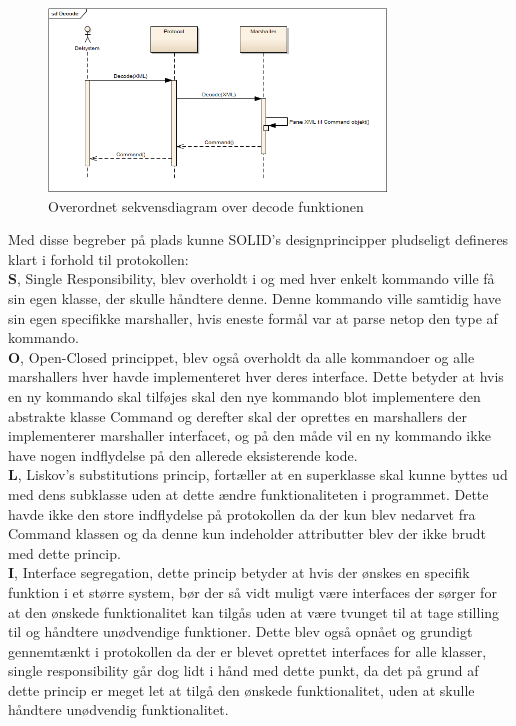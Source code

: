 \begin{figure}[H]
	\centering
	\includegraphics[width=0.8\textwidth]{Projektbeskrivelse/DesignOgImplementering/SharedLib/Images/Rapport/Decode.png}
	\caption{Overordnet sekvensdiagram over decode funktionen}
	\label{fig:DecodeSL}
\end{figure}

Med disse begreber på plads kunne SOLID's designprincipper pludseligt defineres klart i forhold til protokollen:\\

\textbf{S}, Single Responsibility, blev overholdt i og med hver enkelt kommando ville få sin egen klasse, der skulle håndtere denne. Denne kommando ville samtidig have sin egen specifikke marshaller, hvis eneste formål var at parse netop den type af kommando.\\

\textbf{O}, Open-Closed princippet, blev også overholdt da alle kommandoer og alle marshallers hver havde implementeret hver deres interface. Dette betyder at hvis en ny kommando skal tilføjes skal den nye kommando blot implementere den abstrakte klasse Command og derefter skal der oprettes en marshallers der implementerer marshaller interfacet, og på den måde vil en ny kommando ikke have nogen indflydelse på den allerede eksisterende kode.\\

\textbf{L}, Liskov's substitutions princip, fortæller at en superklasse skal kunne byttes ud med dens subklasse uden at dette ændre funktionaliteten i programmet. Dette havde ikke den store indflydelse på protokollen da der kun blev nedarvet fra Command klassen og da denne kun indeholder attributter blev der ikke brudt med dette princip.\\

\textbf{I}, Interface segregation, dette princip betyder at hvis der ønskes en specifik funktion i et større system, bør der så vidt muligt være interfaces der sørger for at den ønskede funktionalitet kan tilgås uden at være tvunget til at tage stilling til og håndtere unødvendige funktioner. Dette blev også opnået og grundigt gennemtænkt i protokollen da der er blevet oprettet interfaces for alle klasser, single responsibility går dog lidt i hånd med dette punkt, da det på grund af dette princip er meget let at tilgå den ønskede funktionalitet, uden at skulle håndtere unødvendig funktionalitet.\\

